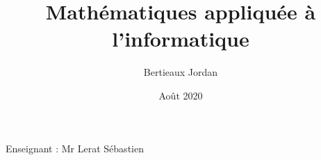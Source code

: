 \documentclass{article}
\title{Mathématiques appliquée à l'informatique}
\author{Bertieaux Jordan}
\date{Août 2020}
\begin{document}
\maketitle
Enseignant : Mr Lerat Sébastien
\end{document}
